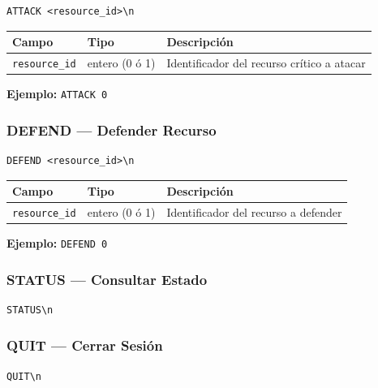 \documentclass[12pt, letterpaper]{article}
\begin{document}
\begin{lstlisting}
ATTACK <resource_id>\n
\end{lstlisting}

\begin{table}[H]
\centering
\begin{tabularx}{\textwidth}{l l X}
\toprule
\textbf{Campo} & \textbf{Tipo} & \textbf{Descripción} \\
\midrule
\texttt{resource\_id} & entero (0 ó 1) & Identificador del recurso crítico a atacar \\
\bottomrule
\end{tabularx}
\end{table}

\textbf{Ejemplo:} \texttt{ATTACK 0}

\subsubsection{DEFEND --- Defender Recurso}

\begin{lstlisting}
DEFEND <resource_id>\n
\end{lstlisting}

\begin{table}[H]
\centering
\begin{tabularx}{\textwidth}{l l X}
\toprule
\textbf{Campo} & \textbf{Tipo} & \textbf{Descripción} \\
\midrule
\texttt{resource\_id} & entero (0 ó 1) & Identificador del recurso a defender \\
\bottomrule
\end{tabularx}
\end{table}

\textbf{Ejemplo:} \texttt{DEFEND 0}

\subsubsection{STATUS --- Consultar Estado}

\begin{lstlisting}
STATUS\n
\end{lstlisting}

\subsubsection{QUIT --- Cerrar Sesión}

\begin{lstlisting}
QUIT\n
\end{lstlisting}
\end{document}

